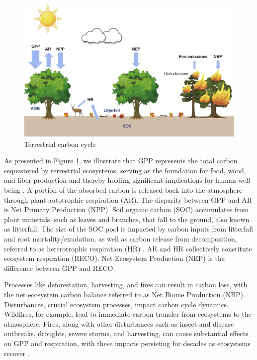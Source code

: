 \begin{figure}
    \centering
    \includegraphics[width=\textwidth]{figs/chap2/fig1.jpg}
    \caption{Terrestrial carbon cycle \citep{xiao2019remote}}
    \label{fig:chap2_fig1}
\end{figure}

As presented in Figure \ref{fig:chap2_fig1}, we illustrate that GPP represents the total carbon sequestered by terrestrial ecosystems, serving as the foundation for food, wood, and fiber production and thereby holding significant implications for human well-being \citep{xiao2019remote}. A portion of the absorbed carbon is released back into the atmosphere through plant autotrophic respiration (AR). The disparity between GPP and AR is Net Primary Production (NPP). Soil organic carbon (SOC) accumulates from plant materials, such as leaves and branches, that fall to the ground, also known as litterfall. The size of the SOC pool is impacted by carbon inputs from litterfall and root mortality/exudation, as well as carbon release from decomposition, referred to as heterotrophic respiration (HR) \citep{liu2011simulating}. AR and HR collectively constitute ecosystem respiration (RECO). Net Ecosystem Production (NEP) is the difference between GPP and RECO. \par
Processes like deforestation, harvesting, and fires can result in carbon loss, with the net ecosystem carbon balance referred to as Net Biome Production (NBP). Disturbances, crucial ecosystem processes, impact carbon cycle dynamics. Wildfires, for example, lead to immediate carbon transfer from ecosystems to the atmosphere. Fires, along with other disturbances such as insect and disease outbreaks, droughts, severe storms, and harvesting, can cause substantial effects on GPP and respiration, with these impacts persisting for decades as ecosystems recover \citep{xiao2019remote}. \par

